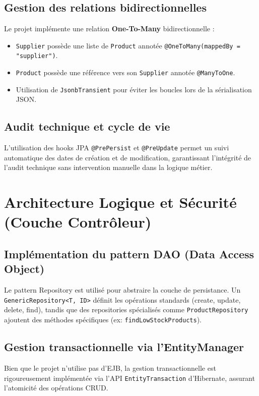 \documentclass[12pt,a4paper]{report}
\begin{document}
\section{Gestion des relations bidirectionnelles}
Le projet implémente une relation \textbf{One-To-Many} bidirectionnelle :
\begin{itemize}
    \item \texttt{Supplier} possède une liste de \texttt{Product} annotée \texttt{@OneToMany(mappedBy = "supplier")}.
    \item \texttt{Product} possède une référence vers son \texttt{Supplier} annotée \texttt{@ManyToOne}.
    \item Utilisation de \texttt{JsonbTransient} pour éviter les boucles lors de la sérialisation JSON.
\end{itemize}

\section{Audit technique et cycle de vie}
L'utilisation des hooks JPA \texttt{@PrePersist} et \texttt{@PreUpdate} permet un suivi automatique des dates de création et de modification, garantissant l'intégrité de l'audit technique sans intervention manuelle dans la logique métier.

\chapter{Architecture Logique et Sécurité (Couche Contrôleur)}

\section{Implémentation du pattern DAO (Data Access Object)}
Le pattern Repository est utilisé pour abstraire la couche de persistance. Un \texttt{GenericRepository<T, ID>} définit les opérations standards (create, update, delete, find), tandis que des repositories spécialisés comme \texttt{ProductRepository} ajoutent des méthodes spécifiques (ex: \texttt{findLowStockProducts}).

\section{Gestion transactionnelle via l'EntityManager}
Bien que le projet n'utilise pas d'EJB, la gestion transactionnelle est rigoureusement implémentée via l'API \texttt{EntityTransaction} d'Hibernate, assurant l'atomicité des opérations CRUD.
\end{document}
